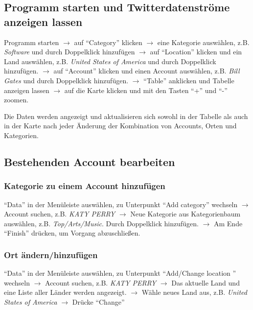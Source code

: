 \subsection{Programm starten und Twitterdatenströme anzeigen lassen}

Programm starten $\to$ auf "`Category"' klicken $\to$ eine Kategorie auswählen, z.B. \textit{Software} und durch Doppelklick hinzufügen $\to$ auf "`Location"' klicken und ein Land auswählen, z.B. \textit{United States of America} und durch Doppelklick hinzufügen. $\to$ auf "`Account"' klicken und einen Account auswählen, z.B. \textit{Bill Gates} und durch Doppelklick hinzufügen. $\to$ "`Table"' anklicken und Tabelle anzeigen lassen $\to$ auf die Karte klicken und mit den Tasten "`+"' und "`-"' zoomen.

Die Daten werden angezeigt und aktualisieren sich sowohl in der Tabelle als auch in der Karte nach jeder Änderung der Kombination von Accounts, Orten und Kategorien.

\subsection{Bestehenden Account bearbeiten}

\subsubsection{Kategorie zu einem Account hinzufügen}
"`Data"' in der Menüleiste auswählen, zu Unterpunkt "`Add category"' wechseln $\to$ Account suchen,  z.B. \textit{KATY PERRY} $\to$ Neue Kategorie aus Kategorienbaum auswählen, z.B. \textit{Top/Arts/Music}. Durch Doppelklick hinzufügen. $\to$ Am Ende "`Finish"' drücken, um Vorgang abzuschließen.

\subsubsection{Ort ändern/hinzufügen}
"`Data"' in der Menüleiste auswählen, zu Unterpunkt "`Add/Change location "' wechseln $\to$ Account suchen,  z.B. \textit{KATY PERRY} $\to$ Das aktuelle Land und eine Liste aller Länder werden angezeigt. $\to$ Wähle neues Land aus, z.B. \textit{United States of America} $\to$ Drücke "`Change"'

